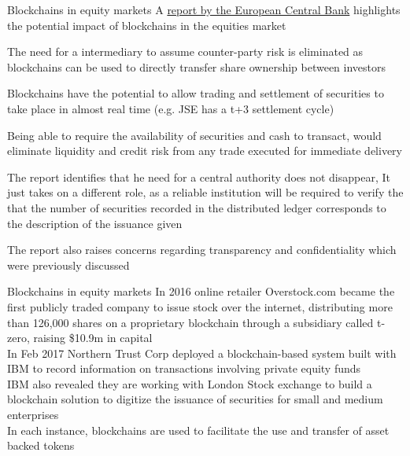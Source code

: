 \documentclass[9pt]{beamer}
\begin{document}

\begin{frame}{Blockchains in equity markets}
	A \href{https://www.ecb.europa.eu/pub/pdf/scpops/ecbop172.en.pdf}{report by the European Central Bank} highlights the potential impact of blockchains in the equities market
	\begin{itemize}
	\end{itemize}
\end{frame}


\begin{frame}{Blockchains in equity markets}
	In 2016 online retailer Overstock.com became the first publicly traded company to issue stock over the internet, distributing more than 126,000 shares on a proprietary blockchain through a subsidiary called t-zero, raising \$10.9m in capital\\ \vspace{3mm}
	In Feb 2017 Northern Trust Corp deployed a blockchain-based system built with IBM to record information on transactions involving private equity funds \\ \vspace{3mm}
	IBM also revealed they are working with London Stock exchange to build a blockchain solution to digitize the issuance of securities for small and medium enterprises\\ \vspace{3mm}
	In each instance, blockchains are used to facilitate the use and transfer of asset backed tokens
\end{frame}
\end{document}
